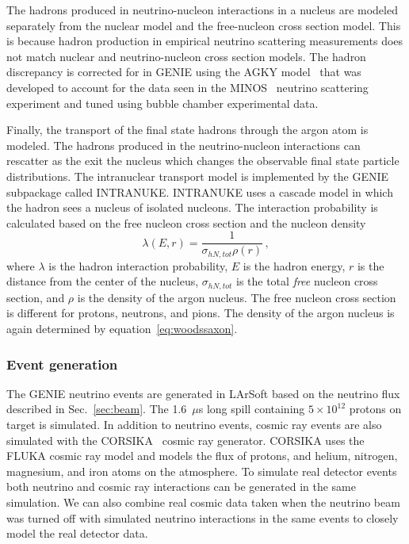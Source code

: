     The hadrons produced in neutrino-nucleon interactions in a nucleus are
    modeled separately from the nuclear model and the free-nucleon cross
    section model. This is because hadron production in empirical neutrino
    scattering measurements does not match nuclear and neutrino-nucleon cross
    section models. The hadron discrepancy is corrected for in GENIE using the
    AGKY model~\cite{Yang:2009zx} that was developed to account for the data seen in
    the MINOS~\cite{Adamson:2007gu} neutrino scattering experiment and tuned using
    bubble chamber experimental data.

    Finally, the transport of the final state hadrons through the argon atom is
    modeled. The hadrons produced in the neutrino-nucleon interactions can
    rescatter as the exit the nucleus which changes the observable final state
    particle distributions. The intranuclear transport model is implemented by
    the GENIE subpackage called INTRANUKE. INTRANUKE uses a cascade model in
    which the hadron sees a nucleus of isolated nucleons. The interaction
    probability is calculated based on the free nucleon cross section and the
    nucleon density~\cite{Andreopoulos:2015wxa}
    \begin{equation}
      \lambda(E,r) = \frac{1}{\sigma_{hN,tot} \rho(r)} \,,
    \end{equation}
    where $\lambda$ is the hadron interaction probability, $E$ is the hadron
    energy, $r$ is the distance from the center of the nucleus,
    $\sigma_{hN,tot}$ is the total \textit{free} nucleon cross section, and
    $\rho$ is the density of the argon nucleus. The free nucleon cross section
    is different for protons, neutrons, and pions. The density of the argon
    nucleus is again determined by equation~\ref{eq:woodssaxon}.

  \subsubsection{Event generation}\label{sec:eventgen}
    The GENIE neutrino events are generated in LArSoft based on the neutrino
    flux described in Sec.~\ref{sec:beam}. The 1.6~$\mu$s long spill containing
    $5\times 10^{12}$ protons on target is simulated.  In addition to neutrino
    events, cosmic ray events are also simulated with the
    CORSIKA~\cite{Heck:1998vt} cosmic ray generator. CORSIKA uses the FLUKA cosmic
    ray model and models the flux of protons, and helium, nitrogen, magnesium,
    and iron atoms on the atmosphere. To simulate real detector events both
    neutrino and cosmic ray interactions can be generated in the same
    simulation. We can also combine real cosmic data taken when the neutrino
    beam was turned off with simulated neutrino interactions in the same events
    to closely model the real detector data.

